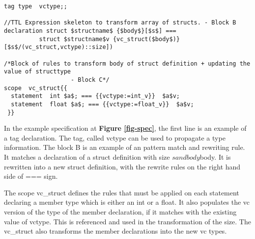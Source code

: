 \documentclass[preprint]{sigplanconf}
\begin{document}
\begin{figure*}

\caption{Introducing VC}
\label{fig-vc2}
\end{figure*}
\begin{figure*}

\begin{lstlisting}
tag type  vctype;;

//TTL Expression skeleton to transform array of structs. - Block B
declaration struct $structname$ {$body$}[$s$] === 
          struct $structname$v {vc_struct($body$)}[$s$/(vc_struct,vctype)::size])

/*Block of rules to transform body of struct definition + updating the value of structtype 
                   - Block C*/
scope  vc_struct{{   
  statement  int $a$; === {{vctype:=int_v}}  $a$v;
  statement  float $a$; === {{vctype:=float_v}}  $a$v; 
 }}
\end{lstlisting}

\caption{Specification sample}
\label{fig-spec}
\end{figure*}

In the example specification at \textbf{Figure \ref{fig-spec}}, the first line is an example of a tag declaration. The tag, called vctype can be used to propagate a type information. 
The block B is an example of an pattern match and rewriting rule. It matches a declaration of a struct definition with size $s and body $body. It is rewritten into a new struct definition, with the rewrite rules on the right hand side of === sign.

The scope vc\_struct defines the rules that must be applied on each statement declaring a member type which is either an int or a float. It also populates the vc version of the type of the member declaration, if it matches with the existing value of vctype. This is referenced and used in the transformation of the size. The vc\_struct also transforms the member declarations into the new vc types. 
\end{document}
